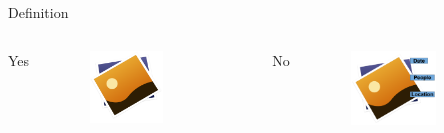\documentclass{beamer}
\begin{document}
\begin{frame}{Definition}
      \begin{columns}[c]
        \begin{center}
          {\color{green} Yes}
        \end{center}
        \begin{figure}
          \includegraphics[width=0.6\textwidth]{images/slides/image.png}
        \end{figure}
        \begin{center}
          {\color{red} No}
        \end{center}
        \begin{figure}
          \includegraphics[width=0.7\textwidth]{images/slides/meta_image.png}
        \end{figure}
      \end{columns}

    \end{frame}
\end{document}
